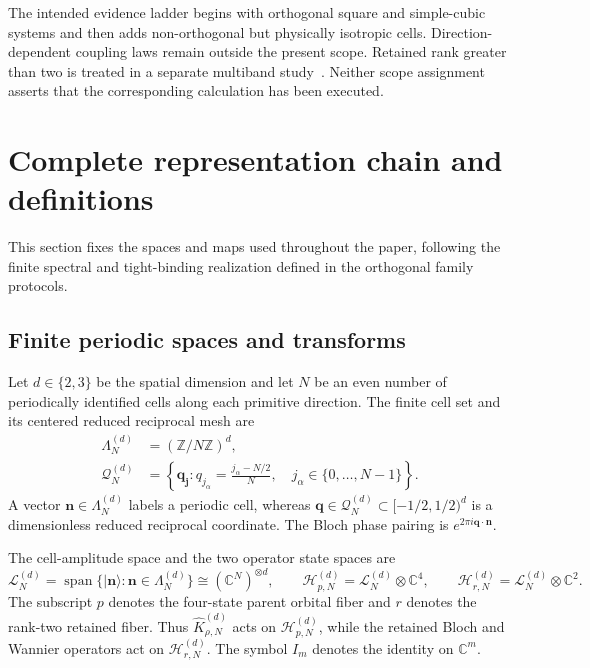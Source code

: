 \documentclass[11pt]{article}
\newenvironment{prospective}{\color{prospectivered}}{}
\newcommand{\C}{\mathbb C}
\begin{document}
\begin{prospective}
The intended evidence ladder begins with orthogonal square and simple-cubic systems and
then adds non-orthogonal but physically isotropic cells. Direction-dependent coupling
laws remain outside the present scope. Retained rank greater than two is treated in a
separate multiband study~\cite{Ragasa2026c}. Neither scope assignment asserts that the
corresponding calculation has been executed.
\end{prospective}

\section{Complete representation chain and definitions}

This section fixes the spaces and maps used throughout the paper, following the finite
spectral and tight-binding realization defined in the orthogonal family protocols.

\subsection{Finite periodic spaces and transforms}

Let $d\in\{2,3\}$ be the spatial dimension and let $N$ be an even number of periodically
identified cells along each primitive direction. The finite cell set and its centered
reduced reciprocal mesh are
\begin{align}
 \Lambda_N^{(d)}&=(\mathbb Z/N\mathbb Z)^d,\\
 \mathcal Q_N^{(d)}
 &=\left\{\mathbf q_{\mathbf j}:q_{j_\alpha}
   =\frac{j_\alpha-N/2}{N},\quad
   j_\alpha\in\{0,\ldots,N-1\}\right\}.
 \label{eq:finite-cell-and-mesh}
\end{align}
A vector $\mathbf n\in\Lambda_N^{(d)}$ labels a periodic cell, whereas
$\mathbf q\in\mathcal Q_N^{(d)}\subset[-1/2,1/2)^d$ is a dimensionless reduced
reciprocal coordinate. The Bloch phase pairing is
$e^{2\pi i\mathbf q\cdot\mathbf n}$.

The cell-amplitude space and the two operator state spaces are
\begin{equation}
 \mathcal L_N^{(d)}
 =\operatorname{span}\{\lvert\mathbf n\rangle:\mathbf n\in\Lambda_N^{(d)}\}
 \cong(\C^N)^{\otimes d},\qquad
 \mathcal H_{p,N}^{(d)}=\mathcal L_N^{(d)}\otimes\C^4,
 \qquad
 \mathcal H_{r,N}^{(d)}=\mathcal L_N^{(d)}\otimes\C^2.
 \label{eq:spaces}
\end{equation}
The subscript $p$ denotes the four-state parent orbital fiber and $r$ denotes the
rank-two retained fiber. Thus $\widehat K_{\rho,N}^{(d)}$ acts on
$\mathcal H_{p,N}^{(d)}$, while the retained Bloch and Wannier operators act on
$\mathcal H_{r,N}^{(d)}$. The symbol $I_m$ denotes the identity on $\C^m$.
\end{document}
